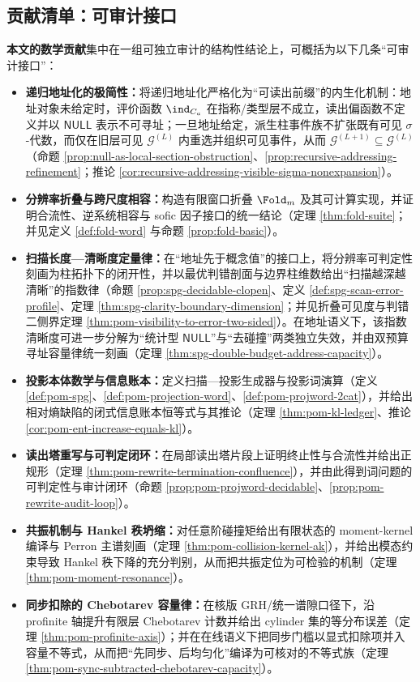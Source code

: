\subsection{贡献清单：可审计接口}\label{subsec:contrib-scope}
\textbf{本文的数学贡献}集中在一组可独立审计的结构性结论上，可概括为以下几条“可审计接口”：
\begin{itemize}
  \item \textbf{递归地址化的极简性：}将递归地址化严格化为“可读出前缀”的内生化机制：地址对象未给定时，评价函数 \(\ind_{C_a}\) 在指称/类型层不成立，读出偏函数不定义并以 \(\mathsf{NULL}\) 表示不可寻址；一旦地址给定，派生柱事件族不扩张既有可见 \(\sigma\)-代数，而仅在旧层可见 \(\mathcal{G}^{(L)}\) 内重选并组织可见事件，从而 \(\mathcal{G}^{(L+1)}\subseteq \mathcal{G}^{(L)}\)（命题 \ref{prop:null-as-local-section-obstruction}、\ref{prop:recursive-addressing-refinement}；推论 \ref{cor:recursive-addressing-visible-sigma-nonexpansion}）。
  \item \textbf{分辨率折叠与跨尺度相容：}构造有限窗口折叠 \(\Fold_m\) 及其可计算实现，并证明合流性、逆系统相容与 sofic 因子接口的统一结论（定理 \ref{thm:fold-suite}；并见定义 \ref{def:fold-word} 与命题 \ref{prop:fold-basic}）。
  \item \textbf{扫描长度—清晰度定量律：}在“地址先于概念值”的接口上，将分辨率可判定性刻画为柱拓扑下的闭开性，并以最优判错剖面与边界柱维数给出“扫描越深越清晰”的指数律（命题 \ref{prop:spg-decidable-clopen}、定义 \ref{def:spg-scan-error-profile}、定理 \ref{thm:spg-clarity-boundary-dimension}；并见折叠可见度与判错二侧界定理 \ref{thm:pom-visibility-to-error-two-sided}）。在地址语义下，该指数清晰度可进一步分解为“统计型 \(\mathsf{NULL}\)”与“去碰撞”两类独立失效，并由双预算寻址容量律统一刻画（定理 \ref{thm:spg-double-budget-address-capacity}）。
  \item \textbf{投影本体数学与信息账本：}定义扫描—投影生成器与投影词演算（定义 \ref{def:pom-spg}、\ref{def:pom-projection-word}、\ref{def:pom-projword-2cat}），并给出相对熵缺陷的闭式信息账本恒等式与其推论（定理 \ref{thm:pom-kl-ledger}、推论 \ref{cor:pom-ent-increase-equals-kl}）。
  \item \textbf{读出塔重写与可判定闭环：}在局部读出塔片段上证明终止性与合流性并给出正规形（定理 \ref{thm:pom-rewrite-termination-confluence}），并由此得到词问题的可判定性与审计闭环（命题 \ref{prop:pom-projword-decidable}、\ref{prop:pom-rewrite-audit-loop}）。
  \item \textbf{共振机制与 Hankel 秩坍缩：}对任意阶碰撞矩给出有限状态的 moment-kernel 编译与 Perron 主谱刻画（定理 \ref{thm:pom-collision-kernel-ak}），并给出模态约束导致 Hankel 秩下降的充分判别，从而把共振定位为可检验的机制（定理 \ref{thm:pom-moment-resonance}）。
  \item \textbf{同步扣除的 Chebotarev 容量律：}在核版 GRH/统一谱隙口径下，沿 profinite 轴提升有限层 Chebotarev 计数并给出 cylinder 集的等分布误差（定理 \ref{thm:pom-profinite-axis}）；并在在线语义下把同步门槛以显式扣除项并入容量不等式，从而把“先同步、后均匀化”编译为可核对的不等式族（定理 \ref{thm:pom-sync-subtracted-chebotarev-capacity}）。
\end{itemize}

